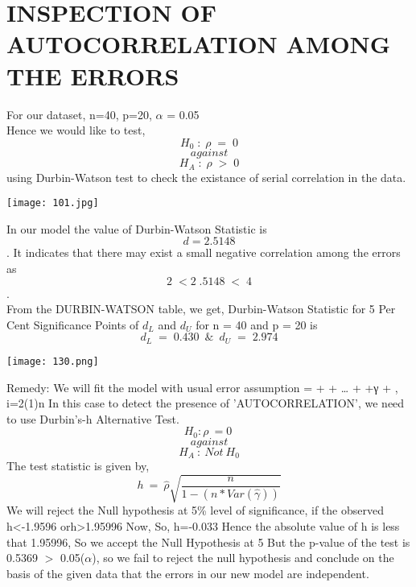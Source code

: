 \documentclass[a4paper,12pt,twoside]{book}
\begin{document}
\section{INSPECTION OF AUTOCORRELATION AMONG THE ERRORS}
For our dataset, n=40, p=20, $\alpha$ = 0.05\\
Hence we would like to test,\\
\[H_0\;:\;\rho\;=\;0\]\[against\] \[H_A\;:\;\rho\;>\;0\] using Durbin-Watson test to check the existance of serial correlation in the data.
\begin{center}
\texttt{[image: 101.jpg]}\\
\end{center}
In our model the value of Durbin-Watson Statistic is \[d=2.5148\]. It indicates that there may exist a small negative correlation among the errors as \[2\;<2\;.5148\;<\;4\].\\
From the DURBIN-WATSON table, we get, Durbin-Watson Statistic for  5 Per Cent Significance Points of $d_L$ and $d_U$ for n = 40 and p = 20 is
 \[d_L\;=\;0.430\;\:\&\:\;d_U\;=\;2.974\]
 \begin{center}
\texttt{[image: 130.png]}\\
\end{center}
Remedy:
We will fit the model with usual error assumption
= + + … + +γ + , i=2(1)n
In this case to detect the presence of 'AUTOCORRELATION', we need to use Durbin's-h Alternative Test.
\[H_0:\rho\:=0\:\]\[against\]\[H_A\::\:Not\:H_0\]
The test statistic is given by,
\[h\:=\:\hat{\rho}\sqrt{\frac{n}{1-(n*Var(\hat{\gamma}))}}\]
We will reject the Null hypothesis at 5\% level of significance, if the observed h<-1.9596 orh>1.95996
Now,
So, h=-0.033
Hence the absolute value of h is less that 1.95996, So we accept the Null Hypothesis at 5%
But the p-value of the test is 0.5369 $>$ 0.05($\alpha$), so we fail to reject the null hypothesis and conclude on the basis of the given data that the errors in our new model are independent.
\newpage
\end{document}
